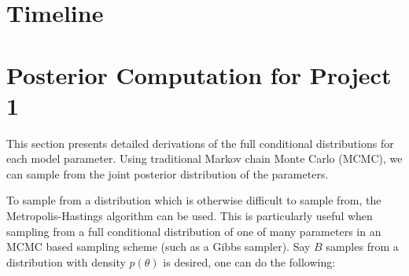 \documentclass[12pt,]{article}
\newcommand{\N}{ \mathcal{N} }
\newcommand{\iid}{\overset{iid}{\sim}}
\def\N{\text{N}}
\newcommand{\bZ}{\mbox{\boldmath $Z$}}
\begin{document}



\section{Timeline}\label{sec:time}

%



\appendix
\section{Posterior Computation for Project 1}
This section presents detailed derivations of the full conditional
distributions for each model parameter. Using traditional Markov
chain Monte Carlo (MCMC), we can sample from the joint posterior 
distribution of the parameters.

To sample from a distribution which is otherwise difficult to sample
from, the Metropolis-Hastings algorithm can be used. This is
particularly useful when sampling from a full conditional distribution
of one of many parameters in an MCMC based sampling scheme (such as a
Gibbs sampler). Say \(B\) samples from a distribution with density
\(p(\theta)\) is desired, one can do the following:
\end{document}

